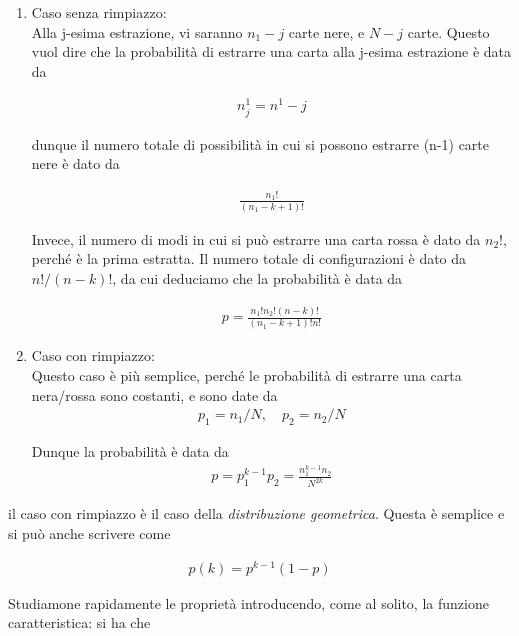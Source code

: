 \documentclass{report}
\begin{document}
\begin{enumerate}
    \item Caso senza rimpiazzo: \\
    
    Alla j-esima estrazione, vi saranno \(n_1 - j\) carte nere, e \(N-j\) carte. Questo vuol dire che la probabilità di estrarre una carta alla j-esima estrazione è data da 

    \begin{align}
        n^1_j = n^1 -j
    \end{align}

    dunque il numero totale di possibilità in cui si possono estrarre (n-1) carte nere è dato da 

    \begin{align}
        \frac{n_1 !}{(n_1 -k+1)!}
    \end{align}

    Invece, il numero di modi in cui si può estrarre una carta rossa è dato da \(n_2!\), perché è la prima estratta. Il numero totale di configurazioni è dato da \(n!/(n-k)!\), da cui deduciamo che la probabilità è data da 

    \begin{align}
        p = \frac{n_1!n_2!(n-k)!}{(n_1 -k+1)!n!}
    \end{align}


    \item Caso con rimpiazzo: \\
    Questo caso è più semplice, perché le probabilità di estrarre una carta nera/rossa sono costanti, e sono date da 
    \begin{align}
        p_1 = n_1/N, \quad p_2 = n_2/N
    \end{align}

    Dunque la probabilità è data da 
    \begin{align}
        p = p_1^{k-1}p_2 = \frac{n_1^{k-1}n_2}{N^{2k}}
    \end{align}
\end{enumerate}

il caso con rimpiazzo è il caso della \emph{distribuzione geometrica}. Questa è semplice e si può anche scrivere come 

\begin{align}
    p(k) = p^{k-1}(1-p)
\end{align}

Studiamone rapidamente le proprietà introducendo, come al solito, la funzione caratteristica: si ha che 
\end{document}
